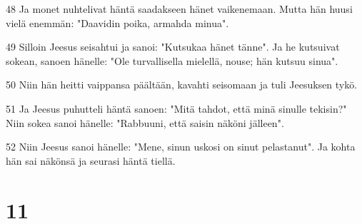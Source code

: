 \par 48 Ja monet nuhtelivat häntä saadakseen hänet vaikenemaan. Mutta hän huusi vielä enemmän: "Daavidin poika, armahda minua".
\par 49 Silloin Jeesus seisahtui ja sanoi: "Kutsukaa hänet tänne". Ja he kutsuivat sokean, sanoen hänelle: "Ole turvallisella mielellä, nouse; hän kutsuu sinua".
\par 50 Niin hän heitti vaippansa päältään, kavahti seisomaan ja tuli Jeesuksen tykö.
\par 51 Ja Jeesus puhutteli häntä sanoen: "Mitä tahdot, että minä sinulle tekisin?" Niin sokea sanoi hänelle: "Rabbuuni, että saisin näköni jälleen".
\par 52 Niin Jeesus sanoi hänelle: "Mene, sinun uskosi on sinut pelastanut". Ja kohta hän sai näkönsä ja seurasi häntä tiellä.

\chapter{11}

